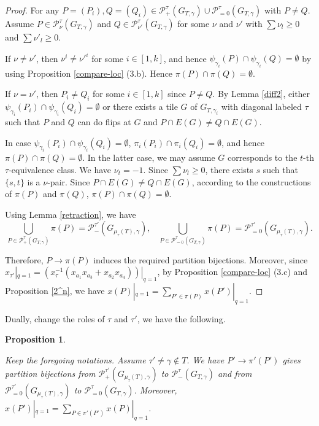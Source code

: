 \documentclass[10pt]{amsart}
\theoremstyle{theorems}
\newtheorem{Proposition}[Theorem]{Proposition}
\begin{document}
\begin{proof}

For any $P=(P_i), Q=(Q_i)\in \mathcal P^{\tau}_{+}(G_{T,\gamma})\cup \mathcal P^{\tau}_{=0}(G_{T,\gamma})$ with $P\neq Q$. Assume $P\in \mathcal P^{\tau}_{\nu}(G_{T,\gamma})$ and $Q\in \mathcal P^{\tau}_{\nu'}(G_{T,\gamma})$ for some $\nu$ and $\nu'$ with $\sum\nu_l\geq 0$ and $\sum\nu'_l\geq 0$.

If $\nu\neq \nu'$, then $\nu^i\neq \nu'^{i}$ for some $i\in [1,k]$, and hence $\psi_{\gamma_i}(P)\cap \psi_{\gamma_i}(Q)=\emptyset$ by using Proposition \ref{compare-loc} (3.b). Hence $\pi(P)\cap \pi(Q)=\emptyset$.

If $\nu=\nu'$, then $P_i\neq Q_i$ for some $i\in [1,k]$ since $P\neq Q$. By Lemma \ref{diff2}, either $\psi_{\gamma_i}(P_i)\cap \psi_{\gamma_i}(Q_i)=\emptyset$ or there exists a tile $G$ of $G_{T,\gamma_i}$ with diagonal labeled $\tau$ such that $P$ and $Q$ can do flips at $G$ and $P\cap E(G)\neq Q\cap E(G)$.

In case $\psi_{\gamma_i}(P_i)\cap \psi_{\gamma_i}(Q_i)=\emptyset$, $\pi_{i}(P_i)\cap \pi_{i}(Q_i)=\emptyset$, and hence $\pi(P)\cap \pi(Q)=\emptyset$. In the latter case, we may assume $G$ corresponds to the $t$-th $\tau$-equivalence class. We have $\nu_t=-1$. Since $\sum\nu_l\geq 0$, there exists $s$ such that $\{s,t\}$ is a $\nu$-pair. Since $P\cap E(G)\neq Q\cap E(G)$, according to the constructions of $\pi(P)$ and $\pi(Q)$, $\pi(P)\cap \pi(Q)=\emptyset$.

Using Lemma \ref{retraction}, we have $$\textstyle\bigcup_{P\in \mathcal P^{\tau}_{+}(G_{T,\gamma})} \pi(P)=\mathcal P^{\tau'}_{-}(G_{\mu_{\tau}(T),\gamma}),\;\;\; \textstyle\bigcup_{P\in \mathcal P^{\tau}_{=0}(G_{T,\gamma})} \pi(P)=\mathcal P^{\tau'}_{=0}(G_{\mu_{\tau}(T),\gamma}).$$

Therefore, $P\rightarrow \pi(P)$ induces the required partition bijections. Moreover, since $x_{\tau'}|_{q=1}=(x^{-1}_{\tau}(x_{a_1}x_{a_3}+x_{a_2}x_{a_4}))|_{q=1}$, by Proposition \ref{compare-loc} (3.c) and Proposition \ref{2^n}, we have $x(P)|_{q=1}=\sum_{P'\in \pi(P)}x(P')|_{q=1}$.
\end{proof}

\medskip

Dually, change the roles of $\tau$ and $\tau'$, we have the following.

\medskip

\begin{Proposition}\label{partition2}

Keep the foregoing notations. Assume $\tau'\neq \gamma \notin T$. We have $P'\rightarrow \pi'(P')$ gives partition bijections from $\mathcal P^{\tau'}_{+}(G_{\mu_{\tau}(T),\gamma})$ to $\mathcal P^{\tau}_{-}(G_{T,\gamma})$ and from $\mathcal P^{\tau'}_{=0}(G_{\mu_{\tau}(T),\gamma})$ to $\mathcal P^{\tau}_{=0}(G_{T,\gamma})$. Moreover, $x(P')|_{q=1}=\sum_{P\in \pi'(P')}x(P)|_{q=1}$.

\end{Proposition}
\end{document}

